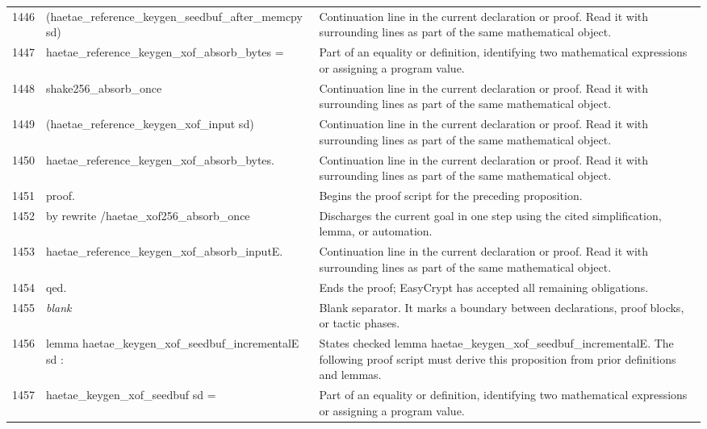 \documentclass[10pt]{article}
\begin{document}
\begin{longtable}{r L{0.53\textwidth} L{0.37\textwidth}}
1446 & {\ttfamily\scriptsize     (haetae\_reference\_keygen\_seedbuf\_after\_memcpy sd)} & Continuation line in the current declaration or proof.  Read it with surrounding lines as part of the same mathematical object. \\
1447 & {\ttfamily\scriptsize     haetae\_reference\_keygen\_xof\_absorb\_bytes =} & Part of an equality or definition, identifying two mathematical expressions or assigning a program value. \\
1448 & {\ttfamily\scriptsize   shake256\_absorb\_once} & Continuation line in the current declaration or proof.  Read it with surrounding lines as part of the same mathematical object. \\
1449 & {\ttfamily\scriptsize     (haetae\_reference\_keygen\_xof\_input sd)} & Continuation line in the current declaration or proof.  Read it with surrounding lines as part of the same mathematical object. \\
1450 & {\ttfamily\scriptsize     haetae\_reference\_keygen\_xof\_absorb\_bytes.} & Continuation line in the current declaration or proof.  Read it with surrounding lines as part of the same mathematical object. \\
1451 & {\ttfamily\scriptsize proof.} & Begins the proof script for the preceding proposition. \\
1452 & {\ttfamily\scriptsize by rewrite /haetae\_xof256\_absorb\_once} & Discharges the current goal in one step using the cited simplification, lemma, or automation. \\
1453 & {\ttfamily\scriptsize            haetae\_reference\_keygen\_xof\_absorb\_inputE.} & Continuation line in the current declaration or proof.  Read it with surrounding lines as part of the same mathematical object. \\
1454 & {\ttfamily\scriptsize qed.} & Ends the proof; EasyCrypt has accepted all remaining obligations. \\
1455 & {\ttfamily\scriptsize \emph{blank}} & Blank separator.  It marks a boundary between declarations, proof blocks, or tactic phases. \\
1456 & {\ttfamily\scriptsize lemma haetae\_keygen\_xof\_seedbuf\_incrementalE sd :} & States checked lemma haetae\_keygen\_xof\_seedbuf\_incrementalE.  The following proof script must derive this proposition from prior definitions and lemmas. \\
1457 & {\ttfamily\scriptsize   haetae\_keygen\_xof\_seedbuf sd =} & Part of an equality or definition, identifying two mathematical expressions or assigning a program value. \\

\end{longtable}
\end{document}
